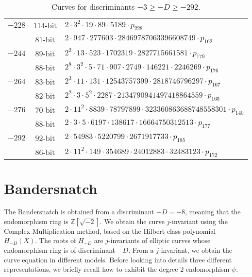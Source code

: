 \documentclass{article}
\newcommand{\Z}{\ensuremath{\mathbb Z}}
\theoremstyle{definition}
\begin{document}
\begin{table*}[!ht]
\begin{tabularx}{\textwidth}{ccl}
$-228$ & $114$-bit & $2  \cdot 3^{2}  \cdot 19  \cdot 89  \cdot 5189  \cdot p_{228}$\\
 & $81$-bit & $2  \cdot 947  \cdot 277603  \cdot 28469787063396608749  \cdot p_{162}$\\
$-244$ & $89$-bit & $2^{2}  \cdot 13  \cdot 523  \cdot 1702319  \cdot 2827715661581  \cdot p_{179}$\\
 & $88$-bit & $2^{8}  \cdot 3^{2}  \cdot 5  \cdot 71  \cdot 907  \cdot 2749  \cdot 146221  \cdot 2246269  \cdot p_{176}$\\
$-264$ & $83$-bit & $2^{3}  \cdot 11  \cdot 131  \cdot 12543757399  \cdot 2818746796297  \cdot p_{167}$\\
 & $82$-bit & $2^{2}  \cdot 3  \cdot 5^{2}  \cdot 2287  \cdot 2134790941497418864559  \cdot p_{165}$\\
$-276$ & $70$-bit & $2  \cdot 11^{2}  \cdot 8839  \cdot 78797899  \cdot 323360863688748558301  \cdot p_{140}$\\
 & $88$-bit & $2  \cdot 3  \cdot 5  \cdot 6197  \cdot 138617  \cdot 16664750312513  \cdot p_{177}$\\
$-292$ & $92$-bit & $2  \cdot 54983  \cdot 5220799  \cdot 2671917733  \cdot p_{185}$\\
 & $86$-bit & $2  \cdot 11^{2}  \cdot 149  \cdot 354689  \cdot
24012883  \cdot 32483123  \cdot p_{172}$\\
\bottomrule
    \end{tabularx}
    \caption{Curves for discriminants $-3 \geq -D \geq -292$.}
    \label{tab:group-order-factorization}
\end{table*}

\section{Bandersnatch}\label{sec:bandersnatch}

The Bandersnatch is obtained from a discriminant $-D = -8$, meaning
that the endomorphism ring is $\Z[\sqrt{-2}]$.
We obtain the curve $j$-invariant using the Complex Multiplication
method, based on the Hilbert class polynomial $H_{-D}(X)$.
The roots of $H_{-D}$ are $j$-invariants of elliptic curves whose
endomorphism ring is of discriminant $-D$.
From a $j$-invariant, we obtain the curve equation in different
models. Before looking into details three different representations,
we briefly recall how to exhibit the degree $2$ endomorphism $\psi$.
\end{document}
